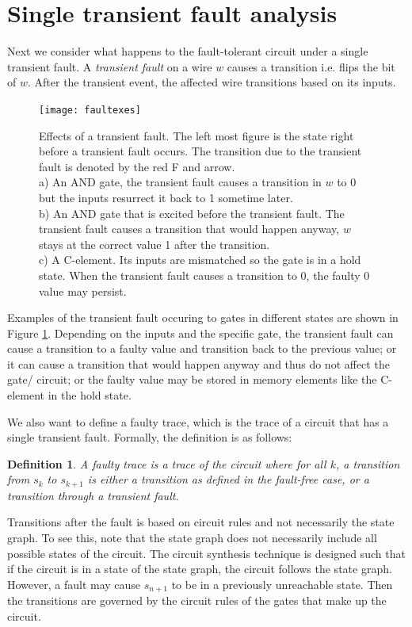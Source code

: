 \documentclass[12pt]{report}
\newtheorem*{definition}{Definition}
\begin{document}
\section{Single transient fault analysis}
Next we consider what happens to the fault-tolerant circuit under a single transient fault.  A {\em transient fault} on a wire $w$ causes a transition i.e. flips the bit of $w$.  After the transient event, the affected wire transitions based on its inputs.  %
\begin{figure}
  \centering
    \texttt{[image: faultexes]}
  \caption{Effects of a transient fault.  The left most figure is the state right before a transient fault occurs.  The transition due to the transient fault is denoted by the red F and arrow.   \\
  a) An AND gate, the transient fault causes a transition in $w$ to 0 but the inputs resurrect it back to 1 sometime later.   \\
  b) An AND gate that is excited before the transient fault.  The transient fault causes a transition that would happen anyway, $w$ stays at the correct value 1 after the transition.\\
  c) A C-element.  Its inputs are mismatched so the gate is in a hold state.  When the transient fault causes a transition to 0, the faulty 0 value may persist.
  }
  \label{fig:faultx}
\end{figure}
Examples of the transient fault occuring to gates in different states are shown in Figure \ref{fig:faultx}.  Depending on the inputs and the specific gate, the transient fault can cause a transition to a faulty value and transition back to the previous value; or it can cause a transition that would happen anyway and thus do not affect the gate/ circuit; or the faulty value may be stored in memory elements like the C-element in the hold state.

We also want to define a faulty trace, which is the trace of a circuit that has a single transient fault.  Formally, the definition is as follows:
\begin{definition}
A {\em faulty trace} is a trace of the circuit where for all $k$, a transition from $s_k$ to $s_{k+1}$ is either a transition as defined in the fault-free case, or a transition through a transient fault.
\end{definition}
Transitions after the fault is based on circuit rules and not necessarily the state graph.  To see this, note that the state graph does not necessarily include all possible states of the circuit.  The circuit synthesis technique is designed such that if the circuit is in a state of the state graph, the circuit follows the state graph.  However, a fault may cause $s_{n+1}$ to be in a previously unreachable state.  Then the transitions are governed by the circuit rules of the gates that make up the circuit.\\ %
\end{document}
